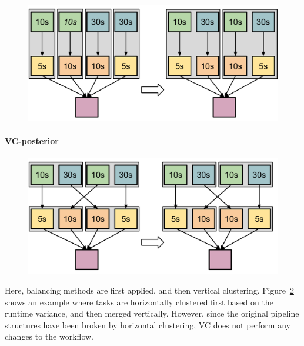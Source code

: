 \begin{figure}[!htb]
	\centering
	\includegraphics[width=0.85\linewidth]{figures/balance/figure12.pdf}
	\label{fig:imbalance_vc_prior}
\end{figure}

\paragraph{\textbf{VC-posterior}} 

\begin{figure}[!htb]
	\centering
	\includegraphics[width=0.85\linewidth]{figures/balance/figure13.pdf}
	\label{fig:imbalance_vc_posterior}
\end{figure}

Here, balancing methods are first applied, and then vertical clustering. Figure~\ref{fig:imbalance_vc_posterior} shows an example where tasks are horizontally clustered first based on the runtime variance, and then merged vertically. However, since the original pipeline structures have been broken by horizontal clustering, VC does not perform any changes to the workflow. 


